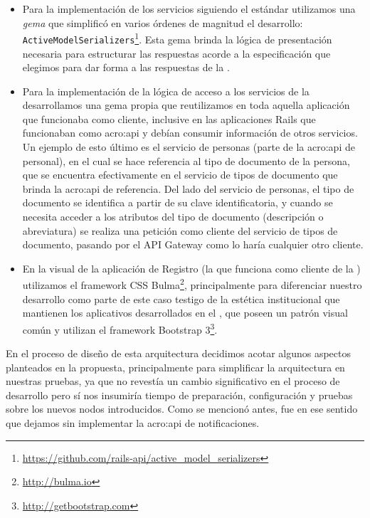 \begin{itemize}
  \item Para la implementación de los servicios siguiendo el estándar  utilizamos una \textit{gema} que simplificó en varios órdenes de magnitud el desarrollo: \texttt{ActiveModelSerializers}\footnote{\url{https://github.com/rails-api/active_model_serializers}}. Esta gema brinda la lógica de presentación necesaria para estructurar las respuestas acorde a la especificación  que elegimos para dar forma a las respuestas de la {\cloud}.

  \item Para la implementación de la lógica de acceso a los servicios de la {\cloud} desarrollamos una gema propia que reutilizamos en toda aquella aplicación que funcionaba como cliente, inclusive en las aplicaciones Rails que funcionaban como \gls{acro:api} y debían consumir información de otros servicios. Un ejemplo de esto último es el servicio de personas (parte de la \gls{acro:api} de personal), en el cual se hace referencia al tipo de documento de la persona, que se encuentra efectivamente en el servicio de tipos de documento que brinda la \gls{acro:api} de referencia. Del lado del servicio de personas, el tipo de documento se identifica a partir de su clave identificatoria, y cuando se necesita acceder a los atributos del tipo de documento (descripción o abreviatura) se realiza una petición como cliente del servicio de tipos de documento, pasando por el API Gateway como lo haría cualquier otro cliente.

  \item En la visual de la aplicación de Registro (la que funciona como cliente de la {\cloud}) utilizamos el framework CSS Bulma\footnote{\url{http://bulma.io}}, principalmente para diferenciar nuestro desarrollo como parte de este caso testigo de la estética institucional que mantienen los aplicativos desarrollados en el {\cespi}, que poseen un patrón visual común y utilizan el framework Bootstrap 3\footnote{\url{http://getbootstrap.com}}.
\end{itemize}

En el proceso de diseño de esta arquitectura decidimos acotar algunos aspectos planteados en la propuesta, principalmente para simplificar la arquitectura en nuestras pruebas, ya que no revestía un cambio significativo en el proceso de desarrollo pero sí nos insumiría tiempo de preparación, configuración y pruebas sobre los nuevos nodos introducidos. Como se mencionó antes, fue en ese sentido que dejamos sin implementar la \gls{acro:api} de notificaciones.

